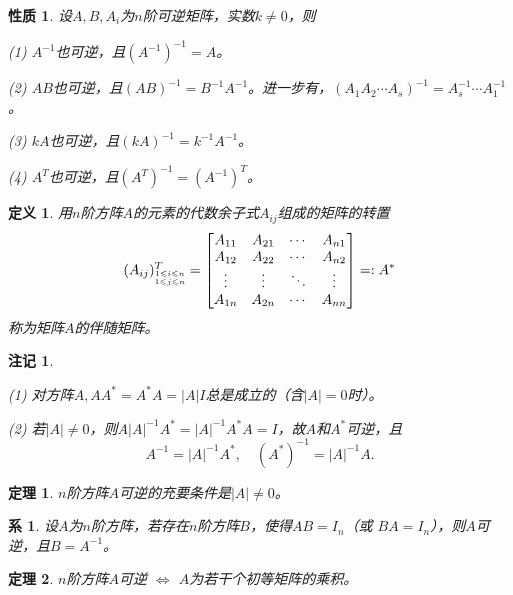 \documentclass[a4paper]{book}
\newtheorem{prop}{性质}[chapter]
\newtheorem{Def}{定义}[chapter]
\newtheorem{cor}{系}[chapter]
\newtheorem{thm}{定理}[chapter]
\newtheorem{rmk}{注记}[chapter]
\newcommand{\enum}{\begin{list}{}{\setlength{\leftmargin}{0pt} \setlength{\itemindent}{2.5em} \setlength{\listparindent}{2em}}}
\begin{document}
\begin{prop}
设$A, B, A_i$为$n$阶可逆矩阵，实数$k\neq 0$，则
\enum
\item[(1)] $A^{-1}$也可逆，且$(A^{-1})^{-1} = A$。
\item[(2)] $AB$也可逆，且$(AB)^{-1} = B^{-1}A^{-1}$。进一步有，$(A_1A_2\cdots A_s)^{-1} = A_s^{-1}\cdots A_1^{-1}$。
\item[(3)] $kA$也可逆，且$(kA)^{-1} = k^{-1}A^{-1}$。
\item[(4)] $A^T$也可逆，且$(A^T)^{-1} = (A^{-1})^T$。
\end{list}
\end{prop}

\begin{Def}
用$n$阶方阵$A$的元素的代数余子式$A_{ij}$组成的矩阵的转置
$$(A_{ij})^T_{\tiny \substack{1 \leqslant i \leqslant n \\ 1 \leqslant j \leqslant n}\normalfont} = \begin{bmatrix}
A_{11} & A_{21} & \cdots & A_{n1} \\
A_{12} & A_{22} & \cdots & A_{n2} \\
\vdots & \vdots & \ddots & \vdots \\
A_{1n} & A_{2n} & \cdots & A_{nn}
\end{bmatrix} =: A^{\ast}$$
称为矩阵$A$的伴随矩阵。
\end{Def}

\begin{rmk}\

\enum
\item[(1)] 对方阵$A, AA^{\ast} = A^{\ast}A = |A|I$总是成立的（含$|A| = 0$时）。
\item[(2)] 若$|A| \neq 0$，则$A|A|^{-1}A^{\ast} = |A|^{-1}A^{\ast}A = I$，故$A$和$A^{\ast}$可逆，且
$$A^{-1} = |A|^{-1}A^{\ast}, \quad (A^{\ast})^{-1} = |A|^{-1}A.$$
\end{list}
\end{rmk}

\begin{thm}
$n$阶方阵$A$可逆的充要条件是$|A| \neq 0$。
\end{thm}

\begin{cor}
设$A$为$n$阶方阵，若存在$n$阶方阵$B$，使得$AB = I_n$（或 $BA = I_n$），则$A$可逆，且$B = A^{-1}$。
\end{cor}

\begin{thm}
$n$阶方阵$A$可逆 $\Longleftrightarrow$ $A$为若干个初等矩阵的乘积。
\end{thm}
\end{document}
